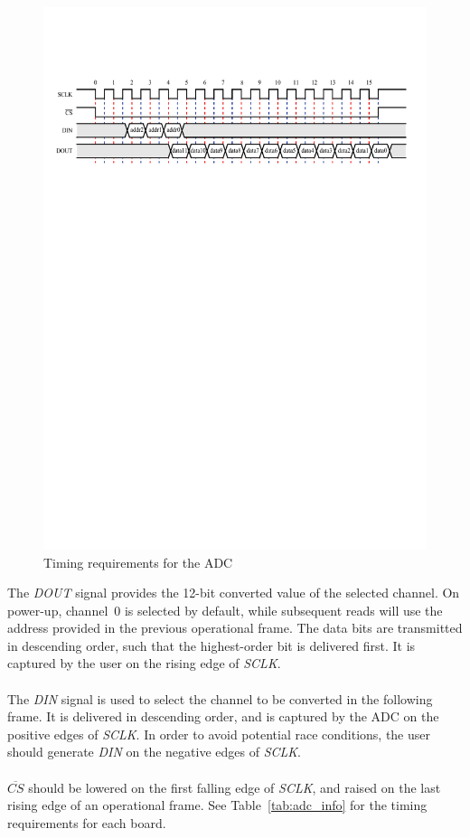 \documentclass[11pt, twoside, pdftex]{article}
\begin{document}
\begin{figure} [h]
\begin{center}
\includegraphics[scale=0.9]{figures/tim_req.pdf}
\end{center}
\caption{Timing requirements for the ADC}
\label{fig:tim_req}
\end{figure}

The \textit{DOUT} signal provides the 12-bit converted value of the selected channel. On power-up, \mbox{channel 0} is selected by default, while subsequent reads will use the address provided in the previous operational frame. The data bits are transmitted in descending order, such that the highest-order bit is delivered first. It is captured by the user on the rising edge of \textit{SCLK}.\\
\\
The \textit{DIN} signal is used to select the channel to be converted in the following frame. It is delivered in descending order, and is captured by the ADC on the positive edges of \textit{SCLK}. In order to avoid potential race conditions, the user should generate \textit{DIN} on the negative edges of \textit{SCLK}.\\
\\
$\overline{CS}$ should be lowered on the first falling edge of \textit{SCLK}, and raised on the last rising edge of an operational frame. 
See Table~\ref{tab:adc_info} for the timing requirements for each board.
\end{document}
